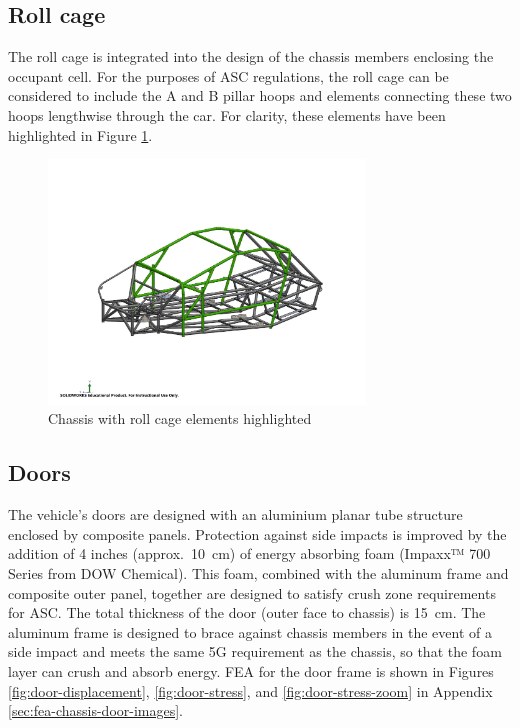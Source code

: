 \documentclass[10pt]{article}
\begin{document}
\subsection{Roll cage}
The roll cage is integrated into the design of the chassis members enclosing the occupant cell. For the purposes of ASC regulations, the roll cage can be considered to include the A and B pillar hoops and elements connecting these two hoops lengthwise through the car. For clarity, these elements have been highlighted in Figure \ref{fig:roll-cage}.

\begin{figure}
\centering
\includegraphics[width=0.75\textwidth]{figures/roll-cage}
\caption{Chassis with roll cage elements highlighted}
\label{fig:roll-cage}
\end{figure}

\subsection{Doors}
The vehicle's doors are designed with an aluminium planar tube structure enclosed by composite panels. Protection against side impacts is improved by the addition of 4 inches (approx.\ \SI{10}{\centi\meter}) of energy absorbing foam (Impaxx™ 700 Series from DOW Chemical). This foam, combined with the aluminum frame and composite outer panel, together are designed to satisfy crush zone requirements for ASC. The total thickness of the door (outer face to chassis) is \SI{15}{\centi\meter}. The aluminum frame is designed to brace against chassis members in the event of a side impact and meets the same 5G requirement as the chassis, so that the foam layer can crush and absorb energy. FEA for the door frame is shown in Figures \ref{fig:door-displacement}, \ref{fig:door-stress}, and \ref{fig:door-stress-zoom} in Appendix \ref{sec:fea-chassis-door-images}.
\end{document}
